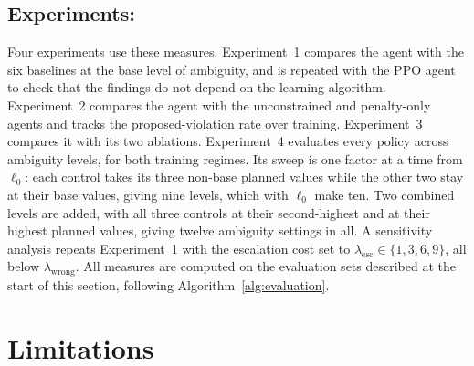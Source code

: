 \subsection{Experiments:}

Four experiments use these measures. Experiment~1 compares the agent with the six baselines at the base level of ambiguity, and is repeated with the PPO agent to check that the findings do not depend on the learning algorithm. Experiment~2 compares the agent with the unconstrained and penalty-only agents and tracks the proposed-violation rate over training. Experiment~3 compares it with its two ablations. Experiment~4 evaluates every policy across ambiguity levels, for both training regimes. Its sweep is one factor at a time from $\ell_0$: each control takes its three non-base planned values while the other two stay at their base values, giving nine levels, which with $\ell_0$ make ten. Two combined levels are added, with all three controls at their second-highest and at their highest planned values, giving twelve ambiguity settings in all. A sensitivity analysis repeats Experiment~1 with the escalation cost set to $\lambda_{\text{esc}} \in \{1, 3, 6, 9\}$, all below $\lambda_{\text{wrong}}$. All measures are computed on the evaluation sets described at the start of this section, following Algorithm~\ref{alg:evaluation}.

\section{Limitations}
\label{sec:limitations}


